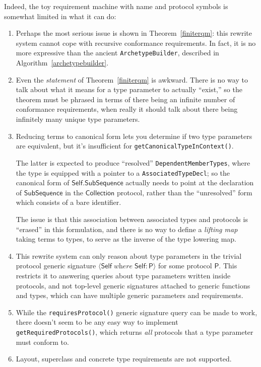 \documentclass[headsepline,bibliography=totoc]{scrreport}
\newcommand{\namesym}[1]{\mathsf{#1}}
\newcommand{\genericparam}[1]{\bm{\mathsf{#1}}}
\newcommand{\proto}[1]{\bm{\mathsf{#1}}}
\newcommand{\gensig}[2]{\langle #1\;\textit{where}\;#2\rangle}
\theoremstyle{definition}
\theoremstyle{definition}
\theoremstyle{definition}
\begin{document}
Indeed, the toy requirement machine with name and protocol symbols is somewhat limited in what it can do:
\begin{enumerate}
\item Perhaps the most serious issue is shown in Theorem~\ref{finiterqm}: this rewrite system cannot cope with recursive conformance requirements. In fact, it is no more expressive than the ancient \texttt{ArchetypeBuilder}, described in Algorithm~\ref{archetypebuilder}.

\item Even the \emph{statement} of Theorem~\ref{finiterqm} is awkward. There is no way to talk about what it means for a type parameter to actually ``exist,'' so the theorem must be phrased in terms of there being an infinite number of conformance requirements, when really it should talk about there being infinitely many unique type parameters.

\item Reducing terms to canonical form lets you determine if two type parameters are equivalent, but it's insufficient for \texttt{getCanonicalTypeInContext()}.

The latter is expected to produce ``resolved'' \texttt{DependentMemberTypes}, where the type is equipped with a pointer to a \texttt{AssociatedTypeDecl}; so the canonical form of $\genericparam{Self}.\namesym{SubSequence}$ actually needs to point at the declaration of $\namesym{SubSequence}$ in the $\proto{Collection}$ protocol, rather than the ``unresolved'' form which consists of a bare identifier.

The issue is that this association between associated types and protocols is ``erased'' in this formulation, and there is no way to define a \emph{lifting map} taking terms to types, to serve as the inverse of the type lowering map.

\item This rewrite system can only reason about type parameters in the trivial protocol generic signature $\gensig{\genericparam{Self}}{\genericparam{Self}\colon\proto{P}}$ for some protocol $\proto{P}$. This restricts it to answering queries about type parameters written inside protocols, and not top-level generic signatures attached to generic functions and types, which can have multiple generic parameters and requirements.
\item While the \texttt{requiresProtocol()} generic signature query can be made to work, there doesn't seem to be any easy way to implement \texttt{getRequiredProtocols()}, which returns \emph{all} protocols that a type parameter must conform to.
\item Layout, superclass and concrete type requirements are not supported.
\end{enumerate}
\end{document}
